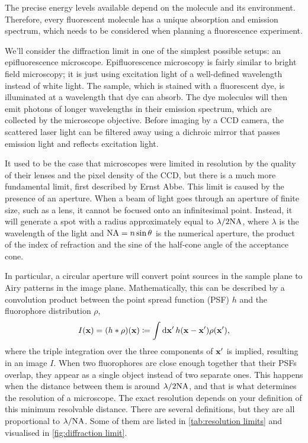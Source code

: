 The precise energy levels available depend on the molecule and its environment. Therefore, every fluorescent molecule has a unique absorption and emission spectrum, which needs to be considered when planning a fluorescence experiment.

We'll consider the diffraction limit in one of the simplest possible setups: an epifluorescence microscope. Epifluorescence microscopy is fairly similar to bright field microscopy; it is just using excitation light of a well-defined wavelength instead of white light. The sample, which is stained with a fluorescent dye, is illuminated at a wavelength that dye can absorb. The dye molecules will then emit photons of longer wavelengths in their emission spectrum, which are collected by the microscope objective. Before imaging by a CCD camera, the scattered laser light can be filtered away using a dichroic mirror that passes emission light and reflects excitation light. 

It used to be the case that microscopes were limited in resolution by the quality of their lenses and the pixel density of the CCD, but there is a much more fundamental limit, first described by Ernst Abbe. This limit is caused by the presence of an aperture. When a beam of light goes through an aperture of finite size, such as a lens, it cannot be focused onto an infinitesimal point. Instead, it will generate a spot with a radius approximately equal to $ \lambda/2\mathrm{NA} $, where $ \lambda $ is the wavelength of the light and $ \mathrm{NA}= n\sin\theta $ is the numerical aperture, the product of the index of refraction and the sine of the half-cone angle of the acceptance cone.

In particular, a circular aperture will convert point sources in the sample plane to Airy patterns in the image plane. Mathematically, this can be described by a convolution product between the point spread function (PSF) $ h $ and the fluorophore distribution $ \rho $,
\begin{equation}
	I(\vb{x}) = (h * \rho)(\vb{x}) \coloneqq \int\dd{\vb{x}'} h(\vb{x}-\vb{x}')\rho(\vb{x}'),
	\label{eq:convolution}
\end{equation}
where the triple integration over the three components of $ \vb{x}' $ is implied, resulting in an image $ I $. When two fluorophores are close enough together that their PSFs overlap, they appear as a single object instead of two separate ones. This happens when the distance between them is around $ \lambda/2\mathrm{NA} $, and that is what determines the resolution of a microscope. The exact resolution depends on your definition of this minimum resolvable distance. There are several definitions, but they are all proportional to $ \lambda/\mathrm{NA} $. Some of them are listed in \autoref{tab:resolution limits} and visualised in \autoref{fig:diffraction limit}.

